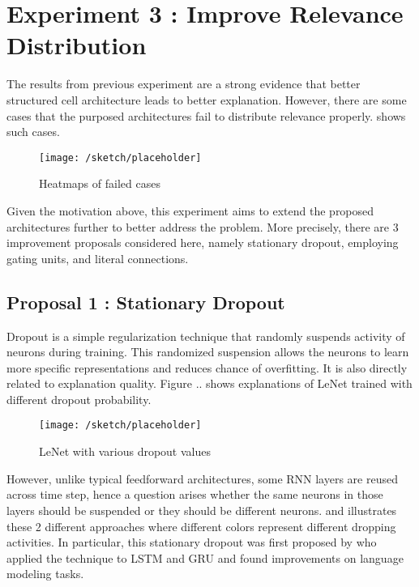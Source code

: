 \section{Experiment 3 : Improve Relevance Distribution}
The results from previous experiment are a strong evidence that better structured cell architecture leads to better explanation. However, there are some cases that the purposed architectures fail to distribute relevance properly.  \addfigure{\ref{fig:rel_failed_cases}} shows such cases. 

\begin{figure}[h]
\centering
\texttt{[image: /sketch/placeholder]}
\caption{Heatmaps of failed cases} 
\label{fig:rel_failed_cases}  %
\end{figure}

Given the motivation above, this experiment aims to extend the proposed architectures further to better address the problem. More precisely, there are 3 improvement proposals considered here, namely stationary dropout, employing gating units,  and literal connections.

\subsection{Proposal 1 :  Stationary Dropout}
Dropout is a simple regularization technique that randomly suspends activity of neurons during training. This randomized suspension allows the neurons to learn more specific representations and reduces chance of overfitting.  It is also directly related to explanation quality. Figure .. shows explanations of LeNet trained with different dropout probability. 

\begin{figure}[h]
\centering
\texttt{[image: /sketch/placeholder]}
\caption{LeNet with various dropout values} 
\label{fig:lenet various dropout}  %
\end{figure}

However, unlike typical feedforward architectures, some RNN layers are reused across time step, hence a question arises whether the same neurons in those layers should be suspended or they should be different neurons. \addfigure{\ref{fig:lstm_naive_dropout}} and \addfigure{\ref{fig:lstm_variational_dropout}} illustrates these 2 different approaches where different colors represent different dropping activities. In particular, this stationary dropout was first proposed by \cite{GalTheoreticallyGroundedApplication2016} who applied  the technique to LSTM and GRU and found improvements on language modeling tasks.


